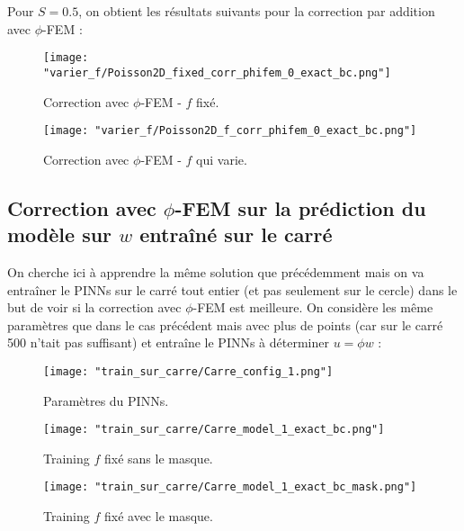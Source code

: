 Pour $S=0.5$, on obtient les résultats suivants pour la correction par addition avec $\phi$-FEM :

\begin{minipage}{0.48\linewidth}
	\begin{figure}[H]
		\centering
		\texttt{[image: "varier\_f/Poisson2D\_fixed\_corr\_phifem\_0\_exact\_bc.png"]}
		\caption{Correction avec $\phi$-FEM - $f$ fixé.}
		\label{Poisson2D_fixed_corr_phifem_0_exact_bc}
	\end{figure}
\end{minipage}
\begin{minipage}{0.48\linewidth}
	\begin{figure}[H]
		\centering
		\texttt{[image: "varier\_f/Poisson2D\_f\_corr\_phifem\_0\_exact\_bc.png"]}
		\caption{Correction avec $\phi$-FEM - $f$ qui varie.}
		\label{Poisson2D_f_corr_phifem_0_exact_bc}
	\end{figure}
\end{minipage}


\subsection{Correction avec $\phi$-FEM sur la prédiction du modèle sur $w$ entraîné sur le carré}

On cherche ici à apprendre la même solution que précédemment mais on va entraîner le PINNs sur le carré tout entier (et pas seulement sur le cercle) dans le but de voir si la correction avec $\phi$-FEM est meilleure. On considère les même paramètres que dans le cas précédent mais avec plus de points (car sur le carré 500 n'tait pas suffisant) et entraîne le PINNs à déterminer $u=\phi w$ :

\begin{figure}[H]
	\centering
	\texttt{[image: "train\_sur\_carre/Carre\_config\_1.png"]}
	\caption{Paramètres du PINNs.}
	\label{config_1}
\end{figure}

\begin{minipage}{0.48\linewidth}
	\begin{figure}[H]
		\centering
		\texttt{[image: "train\_sur\_carre/Carre\_model\_1\_exact\_bc.png"]}
		\caption{Training $f$ fixé sans le masque.}
		\label{Carre_model_1_exact_bc}
	\end{figure}
\end{minipage}
\begin{minipage}{0.48\linewidth}
	\begin{figure}[H]
		\centering
		\texttt{[image: "train\_sur\_carre/Carre\_model\_1\_exact\_bc\_mask.png"]}
		\caption{Training $f$ fixé avec le masque.}
		\label{Carre_model_1_exact_bc_mask}
	\end{figure}
\end{minipage}

